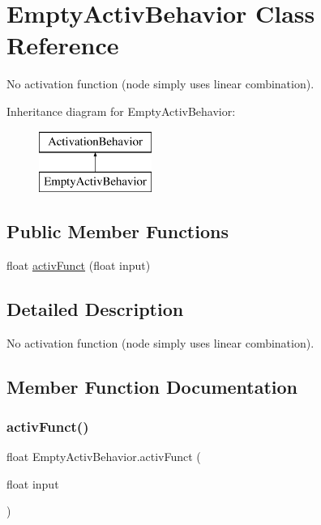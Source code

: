 \hypertarget{class_empty_activ_behavior}{}\section{Empty\+Activ\+Behavior Class Reference}
\label{class_empty_activ_behavior}


No activation function (node simply uses linear combination).  


Inheritance diagram for Empty\+Activ\+Behavior\+:\begin{figure}[H]
\begin{center}
\leavevmode
\includegraphics[height=2.000000cm]{class_empty_activ_behavior}
\end{center}
\end{figure}
\subsection*{Public Member Functions}
\begin{DoxyCompactItemize}
\item 
float \mbox{\hyperlink{class_empty_activ_behavior_acc640ba59f2c258030501f8ec9c537d8}{activ\+Funct}} (float input)
\end{DoxyCompactItemize}


\subsection{Detailed Description}
No activation function (node simply uses linear combination). 



\subsection{Member Function Documentation}
\mbox{\label{class_empty_activ_behavior_acc640ba59f2c258030501f8ec9c537d8}} 
\subsubsection{\texorpdfstring{activ\+Funct()}{activFunct()}}
{\footnotesize\ttfamily float Empty\+Activ\+Behavior.\+activ\+Funct (\begin{DoxyParamCaption}\item[{float}]{input }\end{DoxyParamCaption})}



